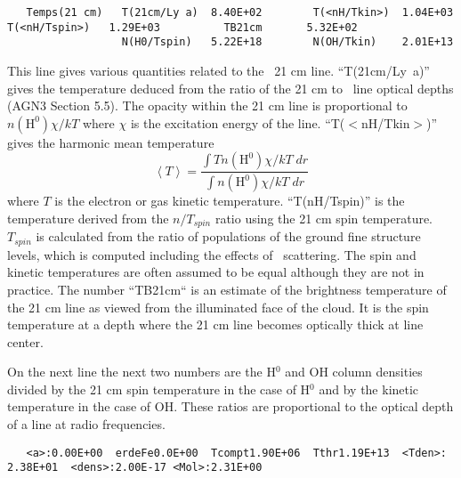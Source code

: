 {\setverbatimfontsize{\tiny}
\begin{verbatim}
   Temps(21 cm)   T(21cm/Ly a)  8.40E+02        T(<nH/Tkin>)  1.04E+03          T(<nH/Tspin>)   1.29E+03          TB21cm       5.32E+02
                  N(H0/Tspin)   5.22E+18        N(OH/Tkin)    2.01E+13
\end{verbatim}
}

This line gives various quantities related to the \hi\ 21 cm line.
``T(21cm/Ly~a)''  gives the temperature deduced from the ratio of the 21
cm to \la\ line optical depths (AGN3 Section 5.5).
The opacity within the
21 cm line is proportional to
$n\left( {{{\mathrm{H}}^0}} \right)\chi /kT$
where $\chi$ is the excitation energy of the line.
``T($<$nH/Tkin$>$)'' gives the harmonic mean  temperature
\begin{equation}
 \left\langle T\right\rangle  = \frac{{\int {Tn\left( {{{\mathrm{H}}^0}} \right)\chi /kT\;dr}
}}{{\int {n\left( {{{\mathrm{H}}^0}} \right)\chi /kT\;dr} }}%
\end{equation}
where $T$ is the electron or gas kinetic temperature.
``T(nH/Tspin)''  is
the temperature derived from the $n/T_{spin}$ ratio using the 21 cm spin
temperature.
$T_{spin}$ is calculated from the ratio of populations of the
ground fine structure levels, which is computed including the effects of
\la\ scattering.
The spin and kinetic temperatures are often assumed to be
equal although they are not in practice.
The number ``TB21cm`` is an
estimate of the brightness temperature of the 21 cm line as viewed from
the illuminated face of the cloud.
It is the spin temperature at a depth
where the 21 cm line becomes optically thick at line center.

On the next line 
the next two numbers are the H$^0$ and OH column densities
divided by the 21 cm spin temperature in the case of H$^0$
and by the kinetic
temperature in the case of OH.
These ratios are proportional to the optical
depth of a line at radio frequencies.
{\setverbatimfontsize{\tiny}
\begin{verbatim}
   <a>:0.00E+00  erdeFe0.0E+00  Tcompt1.90E+06  Tthr1.19E+13  <Tden>: 2.38E+01  <dens>:2.00E-17 <Mol>:2.31E+00
\end{verbatim}
}

